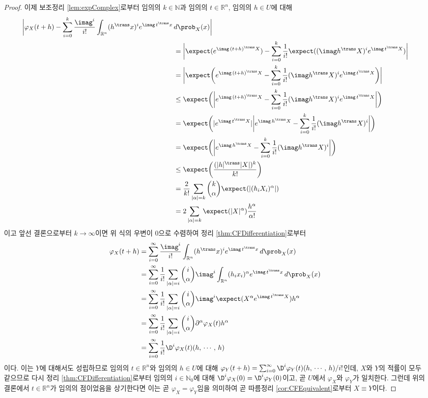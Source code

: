 \begin{proof}
    이제 보조정리 \ref{lem:expComplex}로부터 임의의 $k\in\mathbb{N}$과 임의의 $t\in\mathbb{R}^n$, 임의의 $h\in U$에 대해
    \begin{align*}
        \bigg|\varphi_X(t+h)-\sum_{i=0}^k\frac{\imag^i}{i!}\int_{\mathbb{R}^n}(h^\trans x)^ie^{\imag\,t^\trans x}\,&d\prob_X(x)\bigg|\\
        &=\bigg|\expect(e^{\imag\,(t+h)^\trans X})-\sum_{i=0}^k\frac{1}{i!}\expect((\imag h^\trans X)^ie^{\imag\,t^\trans X})\bigg|\\
        &=\bigg|\expect\bigg(e^{\imag\,(t+h)^\trans X}-\sum_{i=0}^k\frac{1}{i!}(\imag h^\trans X)^ie^{\imag\,t^\trans X}\bigg)\bigg|\\
        &\leq\expect\bigg(\bigg|e^{\imag\,(t+h)^\trans X}-\sum_{i=0}^k\frac{1}{i!}(\imag h^\trans X)^ie^{\imag\,t^\trans X}\bigg|\bigg)\\
        &=\expect\bigg(|e^{\imag\,t^\trans X}|\bigg|e^{\imag\,h^\trans X}-\sum_{i=0}^k\frac{1}{i!}(\imag h^\trans X)^i\bigg|\bigg)\\
        &=\expect\bigg(\bigg|e^{\imag\,h^\trans X}-\sum_{i=0}^k\frac{1}{i!}(\imag h^\trans X)^i\bigg|\bigg)\\
        &\leq\expect\bigg(\frac{(|h|^\trans|X|)^k}{k!}\bigg)\\
        &=\frac{2}{k!}\sum_{|\alpha|=k}\binom{k}{\alpha}\expect(|(h_iX_i)^\alpha|)\\
        &=2\sum_{|\alpha|=k}\expect(|X|^\alpha)\frac{h^\alpha}{\alpha!}
    \end{align*}
    이고 앞선 결론으로부터 $k\to\infty$이면 위 식의 우변이 $0$으로 수렴하여 정리 \ref{thm:CFDifferentiation}로부터
    \begin{align*}
        \varphi_X(t+h)&=\sum_{i=0}^\infty\frac{\imag^i}{i!}\int_{\mathbb{R}^n}(h^\trans x)^ie^{\imag\,t^\trans x}\,d\prob_X(x)\\
        &=\sum_{i=0}^\infty\frac{1}{i!}\sum_{|\alpha|=i}\binom{i}{\alpha}\imag^i\int_{\mathbb{R}^n}(h_ix_i)^\alpha e^{\imag\,t^\trans x}\,d\prob_X(x)\\
        &=\sum_{i=0}^\infty\frac{1}{i!}\sum_{|\alpha|=i}\binom{i}{\alpha}\imag^i\expect(X^\alpha e^{\imag\,t^\trans X})h^\alpha\\
        &=\sum_{i=0}^\infty\frac{1}{i!}\sum_{|\alpha|=i}\binom{i}{\alpha}\partial^\alpha\varphi_X(t)h^\alpha\\
        &=\sum_{i=0}^\infty\frac{1}{i!}\D^i\varphi_X(t)(h,\,\cdots,\,h)
    \end{align*}
    이다. 이는 $Y$에 대해서도 성립하므로 임의의 $t\in\mathbb{R}^n$와 임의의 $h\in U$에 대해 $\varphi_Y(t+h)=\sum_{i=0}^\infty\D^i\varphi_Y(t)(h,\,\cdots,\,h)/i!$인데, $X$와 $Y$의 적률이 모두 같으므로 다시 정리 \ref{thm:CFDifferentiation}로부터 임의의 $i\in\mathbb{N}_0$에 대해 $\D^i\varphi_X(0)=\D^i\varphi_Y(0)$이고, 곧 $U$에서 $\varphi_X$와 $\varphi_Y$가 일치한다. 그런데 위의 결론에서 $t\in\mathbb{R}^n$가 임의의 점이었음을 상기한다면 이는 곧 $\varphi_X=\varphi_Y$임을 의미하여 곧 따름정리 \ref{cor:CFEquivalent}로부터 $X\equiv Y$이다.
\end{proof}

